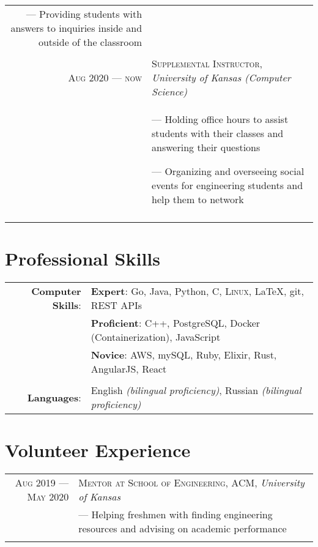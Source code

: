\documentclass[a4paper, 10pt]{article}
\begin{document}
\begin{tabular}{r|p{12cm}}
{		--- Providing students with answers to inquiries inside and outside of the classroom
	}                                                                                                                            \\\multicolumn{2}{c}{}\\
	

	\textsc{Aug 2020 --- now}      & \textsc{Supplemental Instructor}, \emph{University of Kansas (Computer Science)}    \\&\footnotesize{
		--- Holding office hours to assist students with their classes and answering their questions

		--- Organizing and overseeing social events for engineering students and help them to network
	}                               \\\multicolumn{2}{c}{}\\

\end{tabular}

\section{Professional Skills}
\begin{tabular}{rl}
	\textbf{Computer Skills}: &
	\textbf{Expert}: Go, Java, Python, C, \textsc{Linux}, \LaTeX, git, REST APIs                               \\&
	\textbf{Proficient}: C++, PostgreSQL, Docker (Containerization), JavaScript                                \\&
	\textbf{Novice}: AWS, mySQL, Ruby, Elixir, Rust, AngularJS, React                                          \\\\

	\textbf{Languages}:       & English \emph{(bilingual proficiency)}, Russian \emph{(bilingual proficiency)} \\
\end{tabular}

\section{Volunteer Experience}
\begin{tabular}{r|p{12cm}}

	\textsc{Aug 2019 --- May 2020} & \textsc{Mentor at School of Engineering, ACM}, \emph{University of Kansas} \\&\footnotesize{
		--- Helping freshmen with finding engineering resources and advising on academic performance
	}                                                                                                           \\\multicolumn{2}{c}{}\\
\end{tabular}
\end{document}

